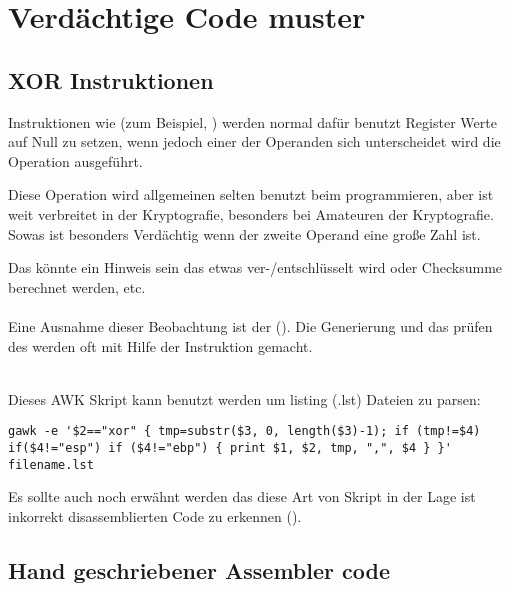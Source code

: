 \section{Verdächtige Code muster}

\subsection{XOR Instruktionen}

Instruktionen wie  (zum Beispiel, )
werden normal dafür benutzt Register Werte auf Null zu setzen, wenn jedoch
einer der Operanden sich unterscheidet wird die  Operation 
ausgeführt.

Diese Operation wird allgemeinen selten benutzt beim programmieren, aber ist
weit verbreitet in der Kryptografie, besonders bei Amateuren der Kryptografie.
Sowas ist besonders Verdächtig wenn der zweite Operand eine große Zahl ist.

Das könnte ein Hinweis sein das etwas ver-/entschlüsselt wird oder Checksumme berechnet werden, etc.\\
\\

Eine Ausnahme dieser Beobachtung ist der  (). 
Die Generierung und das prüfen des  werden oft mit Hilfe der \XOR Instruktion gemacht. \\
\\



Dieses AWK Skript kann benutzt werden um \IDA{} listing (.lst) Dateien zu parsen:

\begin{lstlisting}
gawk -e '$2=="xor" { tmp=substr($3, 0, length($3)-1); if (tmp!=$4) if($4!="esp") if ($4!="ebp") { print $1, $2, tmp, ",", $4 } }' filename.lst
\end{lstlisting}

Es sollte auch noch erwähnt werden das diese Art von Skript in der Lage ist inkorrekt disassemblierten Code zu erkennen
().

\subsection{Hand geschriebener Assembler code}



